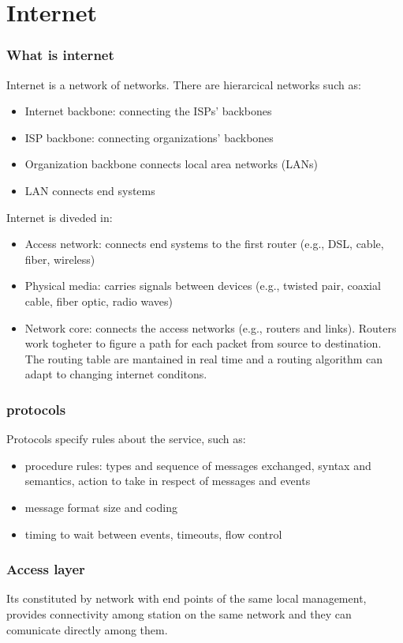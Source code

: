 \chapter{Internet}
\thispagestyle{plain}

\subsection{What is internet}
Internet is a network of networks. There are hierarcical networks such as:
\begin{itemize}
    \item Internet backbone: connecting the ISPs’ backbones
    \item ISP backbone: connecting organizations’ backbones
    \item Organization backbone connects local area networks (LANs)
    \item LAN connects end systems
\end{itemize}

Internet is diveded in:
\begin{itemize}
    \item Access network: connects end systems to the first router (e.g., DSL, cable, fiber, wireless)
    \item Physical media: carries signals between devices (e.g., twisted pair, coaxial cable, fiber optic, radio waves)
    \item Network core: connects the access networks (e.g., routers and links).
    Routers work togheter to figure a path for each packet from source to destination.
    The routing table are mantained in real time and a routing algorithm can adapt to changing internet conditons.
\end{itemize}

\subsection{protocols}
Protocols specify rules about the service, such as:
\begin{itemize}
    \item procedure rules: types and sequence of messages exchanged, syntax and semantics, action to take in respect of messages and events
    \item message format size and coding
    \item timing to wait between events, timeouts, flow control
\end{itemize}

\subsection{Access layer}
Its constituted by network with end points of the same local management, provides connectivity among station on the same network and they can comunicate directly among them.

